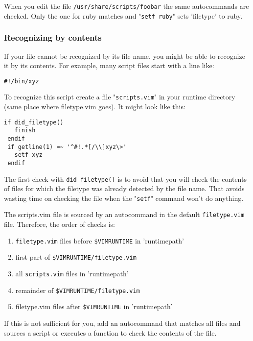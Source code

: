 When you edit the file \verb!/usr/share/scripts/foobar! the same autocommands are checked.
Only the one for ruby matches and "\verb!setf ruby!" sets 'filetype' to ruby.

\subsubsection{Recognizing by contents}
If your file cannot be recognized by its file name, you might be able to recognize it by its contents.
For example, many script files start with a line like:

\begin{Verbatim}[samepage=true]
    #!/bin/xyz 
\end{Verbatim}

To recognize this script create a file "\verb!scripts.vim!" in your runtime directory (same place where filetype.vim goes).
It might look like this:

\begin{Verbatim}[samepage=true]
 if did_filetype()
   finish
 endif
 if getline(1) =~ '^#!.*[/\\]xyz\>'
   setf xyz
 endif
\end{Verbatim}

The first check with \verb!did_filetype()! is to avoid that you will check the contents of files for which the filetype was already detected by the file name.
That avoids wasting time on checking the file when the "\verb!setf!" command won't do anything.

The scripts.vim file is sourced by an autocommand in the default \verb!filetype.vim! file.
Therefore, the order of checks is:

\begin{enumerate}
				\item \verb!filetype.vim! files before \verb!$VIMRUNTIME! in 'runtimepath'
				\item first part of \verb!$VIMRUNTIME/filetype.vim!
				\item all \verb!scripts.vim! files in 'runtimepath'
				\item remainder of \verb!$VIMRUNTIME/filetype.vim!
				\item filetype.vim files after \verb!$VIMRUNTIME! in 'runtimepath'
\end{enumerate}

If this is not sufficient for you, add an autocommand that matches all files and sources a script or executes a function to check the contents of the file.
\clearpage
